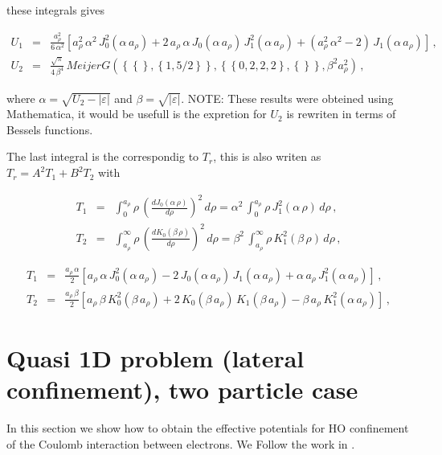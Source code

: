 \documentclass[a4paper,10pt]{article}
\begin{document}
\noindent these integrals gives

\begin{eqnarray}
  U_1 &=& \frac{a_{\rho}^2}{6\,\alpha^2} \left[a_{\rho}^2\,\alpha^2\,J_0^2(\alpha\,a_{\rho})
  + 2\,a_{\rho}\,\alpha\,J_0(\alpha\,a_{\rho})\,J_1^2(\alpha\,a_{\rho}) +
  \left(a_{\rho}^2\,\alpha^2 - 2\right)\,J_1(\alpha\,a_{\rho})\right]\,, \\
  U_2 &=& \frac{\sqrt{\pi}}{4\,\beta^4}\,MeijerG\left(\left\{\left\{ \right\},\left\{1, 5/2 \right\} \right\},
  \left\{\left\{0,2,2,2 \right\}, \left\{ \right\} \right\}, \beta^2 a_{\rho}^2 \right)\,,
\end{eqnarray}

\noindent where $\alpha = \sqrt{U_2-|\varepsilon|}$ and $\beta = \sqrt{|\varepsilon|}$.
NOTE: These results were obteined using Mathematica, it would be usefull is the expretion for $U_2$
is rewriten in terms of Bessels functions.

The last integral is the correspondig to $T_r$, this is also writen as $T_r = A^2 T_1 + B^2 T_2$ with

\begin{eqnarray}
T_1 &=& \int_0^{a_{\rho}} \rho\, \left(\frac{d J_0(\alpha\,\rho)}{d\rho}\right)^2\, d\rho
     = \alpha^2\,\int_0^{a_{\rho}} \rho\,J_1^2(\alpha\,\rho)\, d\rho\,, \\
T_2 &=& \int_{a_{\rho}}^{\infty} \rho\, \left(\frac{d K_0(\beta\,\rho)}{d\rho}\right)^2\, d\rho
     = \beta^2\,\int_{a_{\rho}}^{\infty} \rho\,K_1^2(\beta\,\rho)\, d\rho\,,
\end{eqnarray}

\begin{eqnarray}
T_1 &=& \frac{a_{\rho}\,\alpha}{2} \left[a_{\rho}\,\alpha\,J_0^2(\alpha\,a_{\rho})
     - 2\,J_0(\alpha\,a_{\rho})\,J_1(\alpha\,a_{\rho})
     + \alpha\,a_{\rho}\,J_1^2(\alpha\,a_{\rho}) \right] \,, \\
T_2 &=& \frac{a_{\rho}\,\beta}{2} \left[a_{\rho}\,\beta\,K_0^2(\beta\,a_{\rho})
     + 2\,K_0(\beta\,a_{\rho})\,K_1(\beta\,a_{\rho})
     - \beta\,a_{\rho}\,K_1^2(\alpha\,a_{\rho}) \right] \,,
\end{eqnarray}


\section*{Quasi 1D problem (lateral confinement), two particle case}
In this section we show how to obtain the effective potentials for HO confinement of the
Coulomb interaction between electrons. We Follow the work
in \cite{bednarek_effective_2003}.
\end{document}
